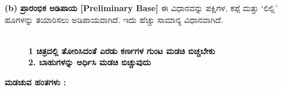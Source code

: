 \begin{enumerate}
\item[{\bf (b)}] \textbf{ಪ್ರಾರಂಭಿಕ ಅಡಿಪಾಯ [Preliminary Base]}
ಈ ವಿಧಾನವನ್ನು ಪಕ್ಷಿಗಳ, ಕಪ್ಪೆ  ಮತ್ತು `ಲಿಲ್ಲಿ' ಹೂಗಳನ್ನು ತಯಾರಿಸಲು ಅಡಿಪಾಯವಾಗಿದೆ. ಇದು ಹೆಚ್ಚು \hbox{ಸಾಮಾನ್ಯ} ವಿಧಾನವಾಗಿದೆ. 
\begin{figure}[H]
\\
\textbf{1 ಚಿತ್ರದಲ್ಲಿ ತೋರಿಸಿದಂತೆ ಎರಡು ಕರ್ಣಗಳ ಗುಂಟ ಮಡಚಿ ಬಿಚ್ಚಬೇಕು}\\
\textbf{2. ಬಾಹುಗಳನ್ನು ಅರ್ಧಿಸಿ ಮಡಚಿ ಬಿಚ್ಚುವುದು}
\end{figure}

\eject

\noindent
\textbf{ಮಡಚುವ ಹಂತಗಳು :}
\begin{figure}[H]
\end{figure}
\begin{figure}[H]
\end{figure}


\end{enumerate}

